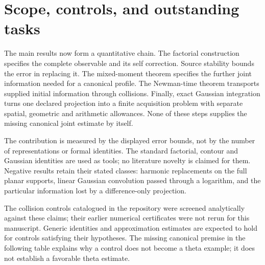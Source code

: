 \section{Scope, controls, and outstanding tasks}\label{sec:outstanding}

The main results now form a quantitative chain. The factorial construction
specifies the complete observable and its self correction. Source
stability bounds the error in replacing it. The mixed-moment theorem
specifies the further joint information needed for a canonical profile.
The Newman-time theorem transports supplied initial information through
collisions. Finally, exact Gaussian integration turns one declared
projection into a finite acquisition problem with separate spatial,
geometric and arithmetic allowances. None of these steps supplies the
missing canonical joint estimate by itself.

The contribution is measured by the displayed error bounds, not by the
number of representations or formal identities. The standard factorial,
contour and Gaussian identities are used as tools; no literature novelty
is claimed for them. Negative results retain their stated classes:
harmonic replacements on the full planar supports, linear Gaussian
convolution passed through a logarithm, and the particular information
lost by a difference-only projection.

The collision controls catalogued in the repository were screened
analytically against these claims; their earlier numerical
certificates were not rerun for this manuscript.
Generic identities and approximation estimates are expected to
hold for controls satisfying their hypotheses. The missing
canonical premise in the following table explains why a control
does not become a theta example; it does not establish a
favorable theta estimate.


